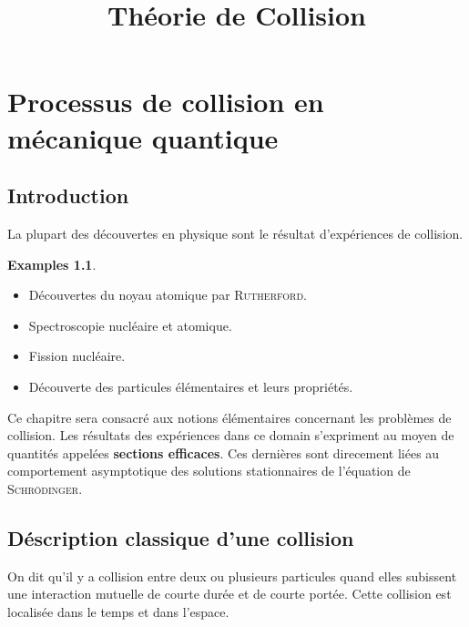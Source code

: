 \documentclass[12pt,a4paper,oneside,french]{book}
\let\myTOC\tableofcontents
\renewcommand\tableofcontents{
    \pdfbookmark[1]{\contentsname}{}
    \myTOC
    \cleardoublepage
    \pagenumbering{arabic}}
\theoremstyle{definition}
\theoremstyle{definition}
\theoremstyle{definition}
\newtheorem*{examples}{Examples}
\theoremstyle{remark}
\theoremstyle{definition}
\begin{document}
    \title{Théorie de Collision}
    \author{}
    
    \maketitle
    \tableofcontents{}
    
    
    
    \chapter{Processus de collision en mécanique quantique}
    
    \section{Introduction}
    La plupart des découvertes en physique sont le résultat d'expériences de collision.
    
    \begin{examples}
        \leavevmode
        
        \begin{itemize}
            \item 
            Découvertes du noyau atomique par \textsc{Rutherford}.
            
            \item
            Spectroscopie nucléaire et atomique.
            
            \item
            Fission nucléaire.
            
            \item
            Découverte des particules élémentaires et leurs propriétés.
        \end{itemize}
    \end{examples}
    
    Ce chapitre sera consacré aux notions élémentaires concernant les problèmes de collision. Les résultats des expériences dans ce domain s'expriment au moyen de quantités appelées \textbf{sections efficaces}. Ces dernières sont direcement liées au comportement asymptotique des solutions stationnaires de l'équation de \textsc{Schrödinger}.
    
    \section{Déscription classique d'une collision}
    On dit qu'il y a collision entre deux ou plusieurs particules quand elles subissent une interaction mutuelle de courte durée et de courte portée. Cette collision est localisée dans le temps et dans l'espace. \\
    
\end{document}
